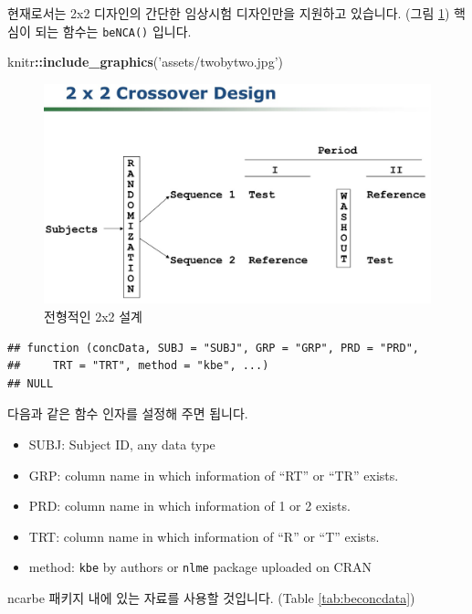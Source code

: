 \documentclass[12pt,]{krantz}
\newenvironment{Shaded}{\begin{snugshade}}{\end{snugshade}}
\newcommand{\KeywordTok}[1]{\textcolor[rgb]{0.13,0.29,0.53}{\textbf{#1}}}
\newcommand{\StringTok}[1]{\textcolor[rgb]{0.31,0.60,0.02}{#1}}
\newcommand{\OperatorTok}[1]{\textcolor[rgb]{0.81,0.36,0.00}{\textbf{#1}}}
\newcommand{\NormalTok}[1]{#1}
\providecommand{\tightlist}{%
  \setlength{\itemsep}{0pt}\setlength{\parskip}{0pt}}
\theoremstyle{definition}
\theoremstyle{definition}
\theoremstyle{definition}
\theoremstyle{remark}
\begin{document}
현재로서는 2x2 디자인의 간단한 임상시험 디자인만을 지원하고 있습니다.
(그림 \ref{fig:twobytwo}) 핵심이 되는 함수는 \texttt{beNCA()} 입니다.

\begin{Shaded}
\begin{Highlighting}[]
\NormalTok{knitr}\OperatorTok{::}\KeywordTok{include_graphics}\NormalTok{(}\StringTok{'assets/twobytwo.jpg'}\NormalTok{)}
\end{Highlighting}
\end{Shaded}

\begin{figure}
\includegraphics[width=1\linewidth]{assets/twobytwo} \caption{전형적인 2x2 설계}\label{fig:twobytwo}
\end{figure}

\begin{verbatim}
## function (concData, SUBJ = "SUBJ", GRP = "GRP", PRD = "PRD", 
##     TRT = "TRT", method = "kbe", ...) 
## NULL
\end{verbatim}

다음과 같은 함수 인자를 설정해 주면 됩니다.

\begin{itemize}
\tightlist
\item
  SUBJ: Subject ID, any data type
\item
  GRP: column name in which information of ``RT'' or ``TR'' exists.
\item
  PRD: column name in which information of 1 or 2 exists.
\item
  TRT: column name in which information of ``R'' or ``T'' exists.
\item
  method: \texttt{kbe} by authors or \texttt{nlme} package uploaded on
  CRAN
\end{itemize}

ncarbe 패키지 내에 있는 자료를 사용할 것입니다. (Table
\ref{tab:beconcdata})
\end{document}
